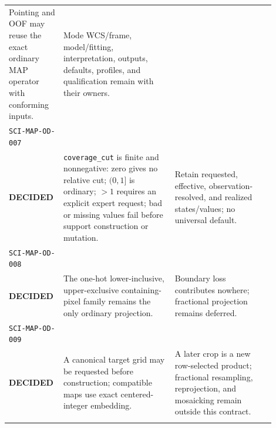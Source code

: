 \begin{longtable}{L{0.14\linewidth}L{0.40\linewidth}L{0.36\linewidth}}
Pointing and OOF may reuse the exact ordinary MAP operator with conforming
inputs. &
Mode WCS/frame, model/fitting, interpretation, outputs, defaults, profiles,
and qualification remain with their owners.\\
\addlinespace[0.35em]
\texttt{SCI-MAP-OD-007}\\\textbf{DECIDED} &
\texttt{coverage\_cut} is finite and nonnegative: zero gives no relative cut;
\((0,1]\) is ordinary; \(>1\) requires an explicit expert request; bad or
missing values fail before support construction or mutation. &
Retain requested, effective, observation-resolved, and realized states/values;
no universal default.\\
\addlinespace[0.35em]
\texttt{SCI-MAP-OD-008}\\\textbf{DECIDED} &
The one-hot lower-inclusive, upper-exclusive containing-pixel family remains
the only ordinary projection. &
Boundary loss contributes nowhere; fractional projection remains deferred.\\
\addlinespace[0.35em]
\texttt{SCI-MAP-OD-009}\\\textbf{DECIDED} &
A canonical target grid may be requested before construction; compatible maps
use exact centered-integer embedding. &
A later crop is a new row-selected product; fractional resampling,
reprojection, and mosaicking remain outside this contract.\\
\addlinespace[0.35em]
\bottomrule
\end{longtable}
\endgroup

